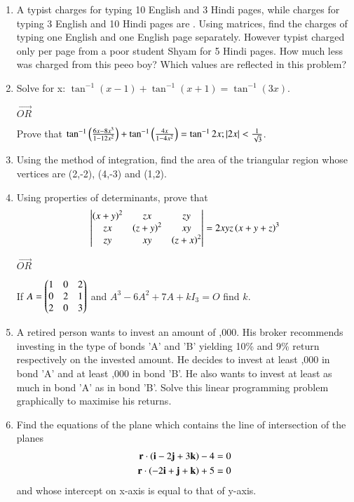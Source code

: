 \documentclass[journal,12pt,twocolumn]{IEEEtran}
\theoremstyle{remark}
\begin{document}
\begin{enumerate}
\item A typist charges  for typing 10 English and 3 Hindi pages, while charges for typing 3 English and 10 Hindi pages are . Using matrices, find the charges of typing one English and one English page separately. However typist charged only  per page from a poor student Shyam for 5 Hindi pages. How much less was charged from this peeo boy? Which values are reflected in this problem?\\

\item Solve for x: $\tan^{-1}(x-1) + \tan^{-1}(x+1) = \tan^{-1}(3x)$.
\begin{center} $\vec{OR}$ \\ \end{center}
Prove that $\tan^{-1}\left(\frac{6x-8x^3}{1-12x^2}\right) + \tan^{-1}\left(\frac{4x}{1-4x^2}\right) = \tan^{-1}2x; \left\vert2x\right\vert<\frac{1}{\sqrt{3}}$.\\

\item Using the method of integration, find the area of the triangular region whose vertices are (2,-2), (4,-3) and (1,2).\\

\item Using properties of determinants, prove that
\begin{align}\begin{vmatrix}\left(x+y\right)^2 & zx & zy \\ zx & \left(z+y\right)^2 & xy \\ zy & xy & \left(z+x\right)^2\end{vmatrix} = 2xyz\left(x+y+z\right)^3\end{align}
\begin{center} $\vec{OR}$ \\ \end{center}
If $A = \begin{pmatrix}1 & 0 & 2 \\ 0 & 2 & 1 \\ 2 & 0 & 3\end{pmatrix}$ and $A^3 - 6A^2 + 7A + kI_3 = O$ find $k$.

\item A retired person wants to invest an amount of ,000. His broker recommends investing in the type of bonds 'A' and 'B' yielding 10\% and 9\% return respectively on the invested amount. He decides to invest at least ,000 in bond 'A' and at least ,000 in bond 'B'. He also wants to invest at least as much in bond 'A' as in bond 'B'. Solve this linear programming problem graphically to maximise his returns.\\

\item Find the equations of the plane which contains the line of intersection of the planes
\begin{align}\mathbf{r}\cdot\left(\mathbf{i} -2\mathbf{j} + 3\mathbf{k}\right)-4&=0 \\ \mathbf{r}\cdot\left(-2\mathbf{i} + \mathbf{j} + \mathbf{k}\right)+5&=0 \end{align}
and whose intercept on x-axis is equal to that of y-axis.\\


\end{enumerate}
\end{document}
